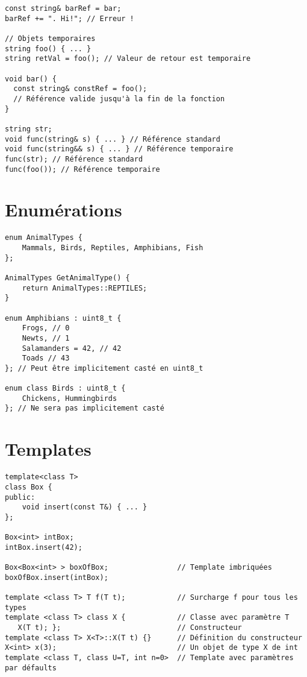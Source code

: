 \documentclass{article}
\begin{document}
\begin{multicols*}{3}
\begin{lstlisting}
const string& barRef = bar;
barRef += ". Hi!"; // Erreur !

// Objets temporaires
string foo() { ... }
string retVal = foo(); // Valeur de retour est temporaire

void bar() {
  const string& constRef = foo();
  // Référence valide jusqu'à la fin de la fonction
}

string str;
void func(string& s) { ... } // Référence standard
void func(string&& s) { ... } // Référence temporaire
func(str); // Référence standard
func(foo()); // Référence temporaire

\end{lstlisting}

\section*{Enumérations}

\begin{lstlisting}
enum AnimalTypes {
    Mammals, Birds, Reptiles, Amphibians, Fish
};

AnimalTypes GetAnimalType() {
    return AnimalTypes::REPTILES;
}

enum Amphibians : uint8_t {
    Frogs, // 0
    Newts, // 1
    Salamanders = 42, // 42
    Toads // 43
}; // Peut être implicitement casté en uint8_t

enum class Birds : uint8_t {
    Chickens, Hummingbirds
}; // Ne sera pas implicitement casté
\end{lstlisting}

\section*{Templates}

\begin{lstlisting}
template<class T>
class Box {
public:
    void insert(const T&) { ... }
};

Box<int> intBox;
intBox.insert(42);

Box<Box<int> > boxOfBox;                // Template imbriquées
boxOfBox.insert(intBox);

template <class T> T f(T t);            // Surcharge f pour tous les types
template <class T> class X {            // Classe avec paramètre T
   X(T t); };                           // Constructeur
template <class T> X<T>::X(T t) {}      // Définition du constructeur
X<int> x(3);                            // Un objet de type X de int
template <class T, class U=T, int n=0>  // Template avec paramètres par défaults


\end{lstlisting}
\end{multicols*}
\end{document}
